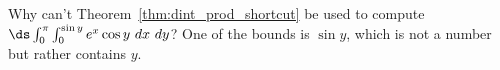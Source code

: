 {Why can't Theorem~\ref{thm:dint_prod_shortcut} be used to compute $\ds \int_0^{\pi} \int_0^{\sin y} e^x \cos y \ dx\ dy$?
}
{One of the bounds is $\sin y$, which is not a number but rather contains $y$.
}
